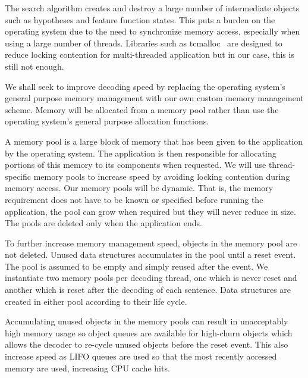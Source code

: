 \documentclass[]{article}
\begin{document}
The search algorithm creates and destroy a large number of intermediate objects such as hypotheses and feature function states. This puts a burden on the operating system due to the need to synchronize memory access, especially when using a large number of threads. Libraries such as tcmalloc~\citep{ghemawat2009tcmalloc} are designed to reduce locking contention for multi-threaded application but in our case, this is still not enough. 

We shall seek to improve decoding speed by replacing the operating system's general purpose memory management with our own custom memory management scheme. Memory will be allocated from a memory pool rather than use the operating system's general purpose allocation functions.

A memory pool is a large block of memory that has been given to the application by the operating system. The application is then responsible for allocating portions of this memory to its components when requested. We will use thread-specific memory pools to increase speed by avoiding locking contention during memory access. Our memory pools will be dynamic. That is, the memory requirement does not have to be known or specified before running the application, the pool can grow when required but they will never reduce in size. The pools are deleted only when the application ends. 

To further increase memory management speed, objects in the memory pool are not deleted. Unused data structures accumulates in the pool until a reset event. The pool is assumed to be empty and simply reused after the event. We instantiate two memory pools per decoding thread, one which is never reset and another which is reset after the decoding of each sentence. Data structures are created in either pool according to their life cycle.

Accumulating unused objects in the memory pools can result in unacceptably high memory usage so object queues are available for high-churn objects which allows the decoder to re-cycle unused objects before the reset event. This also increase speed as LIFO queues are used so that the most recently accessed memory are used, increasing CPU cache hits.

\end{document}

